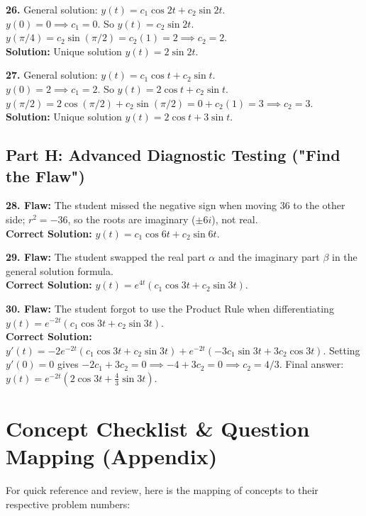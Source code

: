 \documentclass[11pt]{article}
\begin{document}
\vspace{0.5cm}
\noindent\textbf{26.} General solution: $y(t) = c_1 \cos 2t + c_2 \sin 2t$. \\
$y(0) = 0 \implies c_1 = 0$. So $y(t) = c_2 \sin 2t$. \\
$y(\pi/4) = c_2 \sin(\pi/2) = c_2(1) = 2 \implies c_2 = 2$. \\
\textbf{Solution:} Unique solution $y(t) = 2\sin 2t$.

\vspace{0.5cm}
\noindent\textbf{27.} General solution: $y(t) = c_1 \cos t + c_2 \sin t$. \\
$y(0) = 2 \implies c_1 = 2$. So $y(t) = 2\cos t + c_2 \sin t$. \\
$y(\pi/2) = 2\cos(\pi/2) + c_2 \sin(\pi/2) = 0 + c_2(1) = 3 \implies c_2 = 3$. \\
\textbf{Solution:} Unique solution $y(t) = 2\cos t + 3\sin t$.

\subsection*{Part H: Advanced Diagnostic Testing ("Find the Flaw")}
\textbf{28. Flaw:} The student missed the negative sign when moving 36 to the other side; $r^2 = -36$, so the roots are imaginary ($\pm 6i$), not real. \\
\textbf{Correct Solution:} $y(t) = c_1 \cos 6t + c_2 \sin 6t$.

\vspace{0.5cm}
\noindent\textbf{29. Flaw:} The student swapped the real part $\alpha$ and the imaginary part $\beta$ in the general solution formula. \\
\textbf{Correct Solution:} $y(t) = e^{4t}(c_1 \cos 3t + c_2 \sin 3t)$.

\vspace{0.5cm}
\noindent\textbf{30. Flaw:} The student forgot to use the Product Rule when differentiating $y(t) = e^{-2t}(c_1 \cos 3t + c_2 \sin 3t)$. \\
\textbf{Correct Solution:} $y'(t) = -2e^{-2t}(c_1 \cos 3t + c_2 \sin 3t) + e^{-2t}(-3c_1 \sin 3t + 3c_2 \cos 3t)$. Setting $y'(0) = 0$ gives $-2c_1 + 3c_2 = 0 \implies -4 + 3c_2 = 0 \implies c_2 = 4/3$. Final answer: $y(t) = e^{-2t}\left(2\cos 3t + \frac{4}{3}\sin 3t\right)$.

\newpage

\section{Concept Checklist \& Question Mapping (Appendix)}
For quick reference and review, here is the mapping of concepts to their respective problem numbers:
\end{document}
